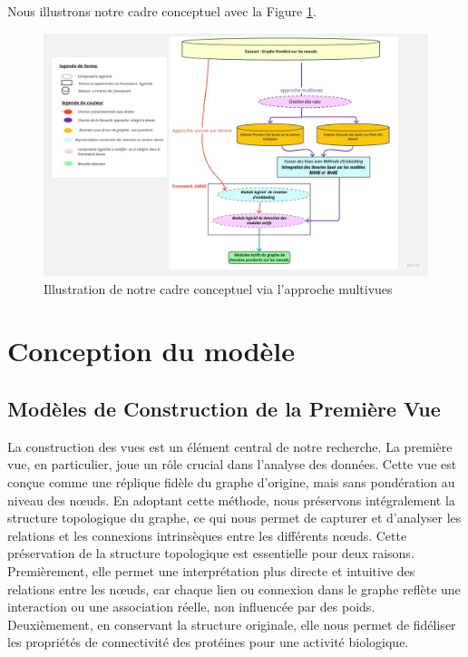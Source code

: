 Nous illustrons notre cadre conceptuel avec la Figure \ref{fig:cadre_conceptuel}.

\begin{figure}[h]
\centering
\includegraphics[width=1\textwidth]{Pictures/cadre_conceptuel.jpg}
\captionsetup{justification=centering}
\caption{Illustration de notre cadre conceptuel via l'approche multivues}
\label{fig:cadre_conceptuel}
\end{figure}


\section{Conception du modèle}

\subsection{Modèles de Construction de la Première Vue}
La construction des vues est un élément central de notre recherche. La première vue, en particulier, joue un rôle crucial dans l'analyse des données. Cette vue est conçue comme une réplique fidèle du graphe d'origine, mais sans pondération au niveau des nœuds. En adoptant cette méthode, nous préservons intégralement la structure topologique du graphe, ce qui nous permet de capturer et d'analyser les relations et les connexions intrinsèques entre les différents nœuds. Cette préservation de la structure topologique est essentielle pour deux raisons. Premièrement, elle permet une interprétation plus directe et intuitive des relations entre les nœuds, car chaque lien ou connexion dans le graphe reflète une interaction ou une association réelle, non influencée par des poids. Deuxièmement, en conservant la structure originale, elle nous permet de fidéliser les propriétés de connectivité des protéines pour une activité biologique.


